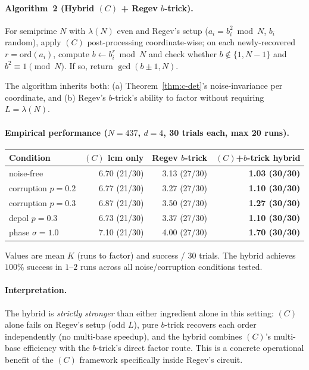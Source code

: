 \documentclass[11pt]{article}
\begin{document}
\paragraph{Algorithm~2 (Hybrid $(C)$ + Regev $b$-trick).} For semiprime $N$ with $\lambda(N)$ even and Regev's setup ($a_i = b_i^2 \bmod N$, $b_i$ random), apply $(C)$ post-processing coordinate-wise; on each newly-recovered $r = \mathrm{ord}(a_i)$, compute $b \leftarrow b_i^r \bmod N$ and check whether $b \notin \{1, N-1\}$ and $b^2 \equiv 1 \pmod N$. If so, return $\gcd(b \pm 1, N)$.

The algorithm inherits both: (a) Theorem~\ref{thm:c-det}'s noise-invariance per coordinate, and (b) Regev's $b$-trick's ability to factor without requiring $L = \lambda(N)$.

\paragraph{Empirical performance ($N = 437$, $d = 4$, 30 trials each, max 20 runs).}

\begin{center}
\begin{tabular}{lrrr}
\toprule
Condition & $(C)$ lcm only & Regev $b$-trick & \textbf{$(C)$+$b$-trick hybrid} \\
\midrule
noise-free          & 6.70 (21/30) & 3.13 (27/30) & \textbf{1.03 (30/30)} \\
corruption $p=0.2$  & 6.77 (21/30) & 3.27 (27/30) & \textbf{1.10 (30/30)} \\
corruption $p=0.3$  & 6.87 (21/30) & 3.50 (27/30) & \textbf{1.27 (30/30)} \\
depol $p=0.3$       & 6.73 (21/30) & 3.37 (27/30) & \textbf{1.10 (30/30)} \\
phase $\sigma=1.0$  & 7.10 (21/30) & 4.00 (27/30) & \textbf{1.70 (30/30)} \\
\bottomrule
\end{tabular}
\end{center}

Values are mean $K$ (runs to factor) and success / 30 trials. The hybrid achieves $100\%$ success in $1$--$2$ runs across all noise/corruption conditions tested.

\paragraph{Interpretation.}
The hybrid is \emph{strictly stronger} than either ingredient alone in this setting: $(C)$ alone fails on Regev's setup (odd $L$), pure $b$-trick recovers each order independently (no multi-base speedup), and the hybrid combines $(C)$'s multi-base efficiency with the $b$-trick's direct factor route. This is a concrete operational benefit of the $(C)$ framework specifically inside Regev's circuit.
\end{document}

